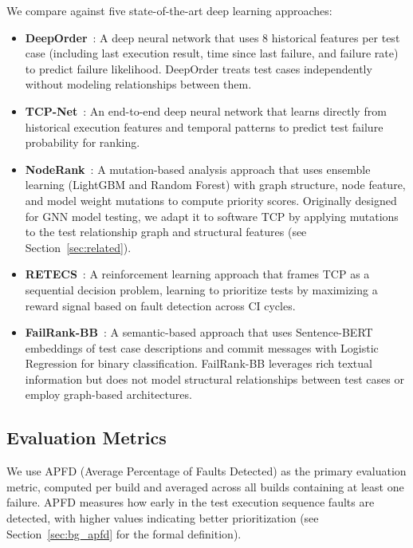 \documentclass[10pt,journal,compsoc]{IEEEtran}
\begin{document}
We compare against five state-of-the-art deep learning approaches:
\begin{itemize}
    \item \textbf{DeepOrder}~\cite{chen2023deeporder}: A deep neural network
    that uses 8 historical features per test case (including last execution
    result, time since last failure, and failure rate) to predict failure
    likelihood. DeepOrder treats test cases independently without modeling
    relationships between them.
    \item \textbf{TCP-Net}~\cite{abdelkarim2022tcp}: An end-to-end deep neural
    network that learns directly from historical execution features and temporal
    patterns to predict test failure probability for ranking.
    \item \textbf{NodeRank}~\cite{li2024noderank}: A mutation-based analysis
    approach that uses ensemble learning (LightGBM and Random Forest) with
    graph structure, node feature, and model weight mutations to compute
    priority scores. Originally designed for GNN model testing, we adapt it
    to software TCP by applying mutations to the test relationship graph and
    structural features (see Section~\ref{sec:related}).
    \item \textbf{RETECS}~\cite{spieker2017reinforcement}: A reinforcement
    learning approach that frames TCP as a sequential decision problem, learning
    to prioritize tests by maximizing a reward signal based on fault detection
    across CI cycles.
    \item \textbf{FailRank-BB}~\cite{hernandes2025method}: A semantic-based
    approach that uses Sentence-BERT embeddings of test case descriptions and
    commit messages with Logistic Regression for binary classification.
    FailRank-BB leverages rich textual information but does not model structural
    relationships between test cases or employ graph-based architectures.
\end{itemize}

\subsection{Evaluation Metrics}

We use APFD (Average Percentage of Faults Detected) as the primary evaluation
metric, computed per build and averaged across all builds containing at least
one failure. APFD measures how early in the test execution sequence faults are
detected, with higher values indicating better prioritization (see
Section~\ref{sec:bg_apfd} for the formal definition).
\end{document}
